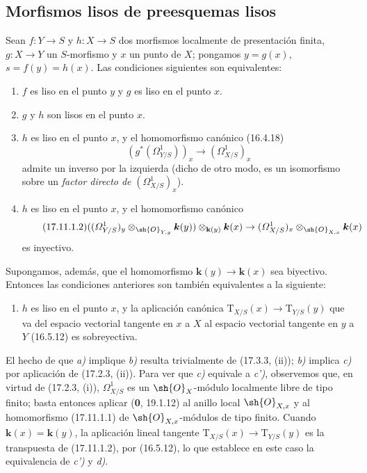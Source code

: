 \subsection{Morfismos lisos de preesquemas lisos}
\label{subsection:IV.17.11}

\begin{theorem}[17.11.1]
\label{IV.17.11.1}
Sean $f:Y\to S$ y $h:X\to S$ dos morfismos localmente de presentación finita, $g:X\to Y$ un $S$-morfismo y $x$ un punto de $X$; pongamos $y=g(x)$, $s=f(y)=h(x)$. Las condiciones siguientes son equivalentes:
\begin{enumerate}
  \item[\textup{a)}] $f$ es liso en el punto $y$ y $g$ es liso en el punto $x$.
  \item[\textup{b)}] $g$ y $h$ son lisos en el punto $x$.
  \item[\textup{c)}] $h$ es liso en el punto $x$, y el homomorfismo canónico \textup{(16.4.18)}
  \begin{equation}
  \label{IV.17.11.1.1}
  \tag{17.11.1.1}
  (g^*(\varOmega^1_{Y/S}))_x\to(\varOmega^1_{X/S})_x
  \end{equation}
  admite un inverso por la izquierda \textup{(dicho de otro modo, es un isomorfismo sobre un \emph{factor directo de} $(\varOmega^1_{X/S})_x$)}.
  \item[\textup{c$'$)}] $h$ es liso en el punto $x$, y el homomorfismo canónico
  \begin{equation}
  \label{IV.17.11.1.2}
  \tag{17.11.1.2}
  ((\varOmega^1_{Y/S})_y\otimes_{\sh{O}_{Y,y}}\boldsymbol{k}(y))\otimes_{\mathbf{k}(y)}\boldsymbol{k}(x)\to(\varOmega^1_{X/S})_x\otimes_{\sh{O}_{X,x}}\boldsymbol{k}(x)
  \end{equation}
  es inyectivo.
\end{enumerate}
Supongamos, además, que el homomorfismo $\boldsymbol k(y)\to\boldsymbol{k}(x)$ sea biyectivo. Entonces las condiciones anteriores son también equivalentes a la siguiente:
\begin{enumerate}
  \item[\textup{d)}] $h$ es liso en el punto $x$, y la aplicación canónica $\mathrm{T}_{X/S}(x)\to\mathrm{T}_{Y/S}(y)$ que va del espacio vectorial tangente en $x$ a $X$ al espacio vectorial tangente en $y$ a $Y$ \textup{(16.5.12)} es sobreyectiva.
\end{enumerate}
\end{theorem}

El hecho de que \emph{a)} implique \emph{b)} resulta trivialmente de (17.3.3, (ii)); \emph{b)} implica \emph{c)} por aplicación de (17.2.3, (ii)). Para ver que \emph{c)} equivale a \emph{c')}, observemos que, en virtud de (17.2.3, (i)), $\varOmega^1_{X/S}$ es un $\sh{O}_X$-módulo localmente libre de tipo finito; basta entonces aplicar (\textbf 0, 19.1.12) al anillo local $\sh{O}_{X,x}$ y al homomorfismo (17.11.1.1) de $\sh{O}_{X,x}$-módulos de tipo finito. Cuando $\boldsymbol k(x)=\boldsymbol k(y)$, la aplicación lineal tangente $\mathrm{T}_{X/S}(x)\to\mathrm{T}_{Y/S}(y)$ es la transpuesta de (17.11.1.2), por (16.5.12), lo que establece en este caso la equivalencia de \emph{c')} y \emph{d)}.

